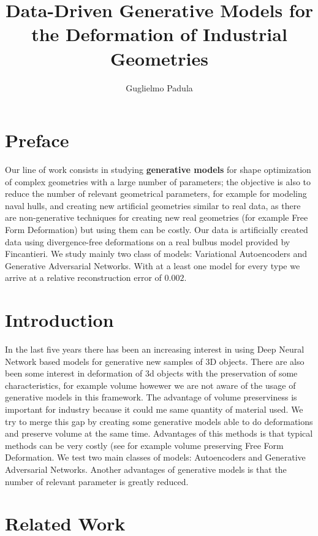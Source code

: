 \documentclass{article}
\title{Data-Driven Generative Models for the Deformation of Industrial Geometries}
\author{Guglielmo Padula}
\begin{document}
\maketitle

\section{Preface}
Our line of work consists in studying \textbf{generative models} for shape optimization of complex geometries with a large number of parameters; the objective is also to reduce the number of relevant geometrical parameters, for example for modeling naval hulls, and creating new artificial geometries similar to real data, as there are non-generative techniques for creating new real geometries (for example Free Form Deformation) but using them can be costly. Our data is artificially created data using divergence-free deformations on a real bulbus model provided by Fincantieri. We study mainly two class of models: Variational Autoencoders and Generative Adversarial Networks. With at a least one model for every type we arrive at a relative reconstruction error of $0.002$.

\section{Introduction}
In the last five years there has been an increasing interest in using Deep Neural Network based models for generative new samples of 3D objects. There are also been some interest in deformation of 3d objects with the preservation of some characteristics, for example volume howewer we are not aware of the usage of generative models in this framework. The advantage of volume preserviness is important for industry because it could me same quantity of material used. 
We try to merge this gap by creating some generative models able to do deformations and preserve volume at the same time. Advantages of this methods is that typical methods can be very costly (see for example volume preserving Free Form Deformation. We test two main classes of models: Autoencoders and Generative Adversarial Networks. Another advantages of generative models is that the number of relevant parameter is greatly reduced.

\section{Related Work}
\end{document}
